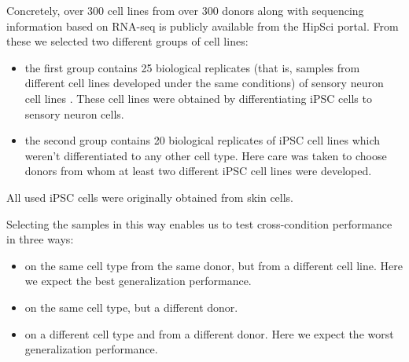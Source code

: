 Concretely, over 300 cell lines from over 300 donors along with sequencing information based on RNA-seq is publicly available from the HipSci portal. From these we selected two different groups of cell lines:
\begin{itemize}
	
	\item the first group contains 25 biological replicates (that is, samples from different cell lines developed under the same conditions) of sensory neuron cell lines \cite{ipscneurons}. These cell lines were obtained by differentiating iPSC cells to sensory neuron cells.
	\item the second group contains 20 biological replicates of iPSC cell lines which weren't differentiated to any other cell type. Here care was taken to choose donors from whom at least two different iPSC cell lines were developed.
	
\end{itemize}

All used iPSC cells were originally obtained from skin cells. 

Selecting the samples in this way enables us to test cross-condition performance in three ways:
\begin{itemize}
	\item on the same cell type from the same donor, but from a different cell line. Here we expect the best generalization performance.
	\item on the same cell type, but a different donor.
	\item on a different cell type and from a different donor. Here we expect the worst generalization performance.
\end{itemize}



